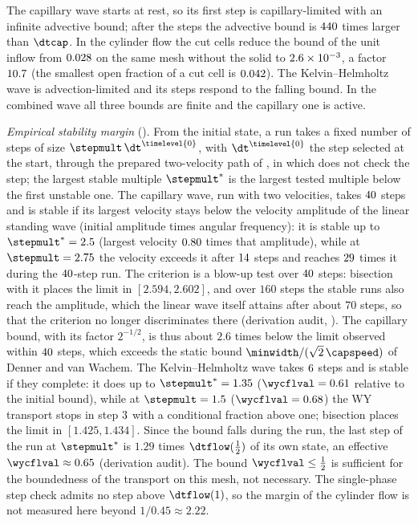 The capillary wave starts at rest, so its first step is capillary-limited
with an infinite advective bound; after the steps the advective bound is
$440$ times larger than $\dtcap$. In the cylinder flow the
cut cells reduce the bound of the unit inflow from $0.028$ on the
same mesh without the solid to $2.6\times10^{-3}$, a factor
$10.7$ (the smallest open fraction of a cut cell is
$0.042$). The Kelvin--Helmholtz wave is advection-limited and
its steps respond to the falling bound. In the combined wave all three
bounds are finite and the capillary one is active.

\emph{Empirical stability margin} (). From the
initial state, a run takes a fixed number of steps of size
$\stepmult\,\dt^{\timelevel{0}}$, with $\dt^{\timelevel{0}}$ the step selected
at the start, through the prepared two-velocity path of
, in which  does not check the step; the
largest stable multiple $\stepmult^{*}$ is the largest tested multiple below
the first unstable one. The capillary wave, run with two velocities, takes
$40$ steps and is stable if its largest velocity stays
below the velocity amplitude of the linear standing wave (initial amplitude
times angular frequency): it is stable up to
$\stepmult^{*}=\chkStabWaveMargin$ (largest velocity $0.80$
times that amplitude), while at $\stepmult=\chkStabWaveUnstable$ the
velocity exceeds it after $14$ steps and reaches
$29$ times it during the $40$-step
run. The criterion is a blow-up test over $40$ steps:
bisection with it places the limit in $[2.594,2.602]$, and over $160$ steps
the stable runs also reach the amplitude, which the linear wave itself
attains after about $70$ steps, so that the criterion no longer
discriminates there (derivation audit,
). The capillary bound, with its
factor $2^{-1/2}$, is thus about $2.6$ times below the limit observed within
$40$ steps, which exceeds the static bound
$\minwidth/(\sqrt2\,\capspeed)$ of Denner and van Wachem. The
Kelvin--Helmholtz wave takes $6$ steps and is stable if
they complete: it does up to $\stepmult^{*}=\chkStabKhMargin$
($\wycflval=\chkStabKhMarginCfl$ relative to the initial bound), while at
$\stepmult=\chkStabKhUnstable$ ($\wycflval=\chkStabKhUnstableCfl$) the WY
transport stops in step $3$ with a conditional fraction
above one; bisection places the limit in $[1.425,1.434]$. Since the bound
falls during the run, the last step of the run at $\stepmult^{*}$ is
$1.29$ times $\dtflow(\half)$ of its own state, an effective
$\wycflval\approx0.65$ (derivation audit). The bound $\wycflval\le\half$ is
sufficient for the boundedness of the transport on this mesh, not necessary.
The single-phase step check admits no step above $\dtflow(1)$, so the margin of
the cylinder flow is not measured here beyond $1/0.45\approx2.22$.

